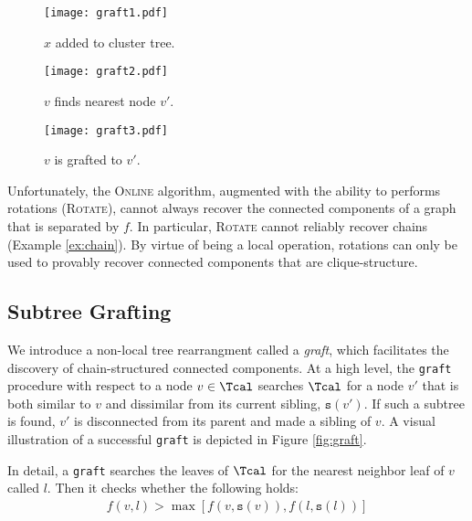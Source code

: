 \documentclass{article} \usepackage[utf8]{inputenc} \usepackage[T1]{fontenc}    \usepackage{hyperref}       \usepackage{url}            \usepackage{booktabs}       \usepackage{amsfonts}       \usepackage{nicefrac}       \usepackage{microtype}      \usepackage{geometry}
\newcommand{\algrotate}{\textsc{Rotate}\xspace}
\newcommand{\greedy}{\textsc{Online}\xspace}
\newcommand{\graft}{\texttt{graft}\xspace}
\newcommand{\sib}[1]{\ensuremath{\texttt{s}}(#1)\xspace}
\newcommand{\condition}[2]{\ensuremath{f(#1, #2) > \max[f(#1, \sib{#1}), f(#2, \sib{#2})]}}
\begin{document}
\begin{figure*}[t]
\captionsetup[subfigure]{justification=centering}
\begin{subfigure}[h]{0.32\textwidth}
  \centerline{\texttt{[image: graft1.pdf]}}
  \caption{$x$ added to cluster tree.}
\end{subfigure}
\begin{subfigure}[h]{0.32\textwidth}
  \centerline{\texttt{[image: graft2.pdf]}}
  \caption{$v$ finds nearest node $v'$.}
\end{subfigure}
\begin{subfigure}[h]{0.32\textwidth}
  \centerline{\texttt{[image: graft3.pdf]}}
  \caption{$v$ is grafted to $v'$.}
\end{subfigure}
\caption{The \texttt{graft} subroutine. Dotted lines denote new
  nodes and mergers. Before $x$ is added to tree, $l$ and $v'$ reside
  in disjoint subtrees even though they belong to the same
  ground-truth cluster. The addition of $x$ creates the subtree with root
  $v$ and initiates the \texttt{graft} subroutine.}
\label{fig:graft}
\end{figure*}
 
Unfortunately, the \greedy algorithm, augmented with the ability to
performs rotations (\algrotate), cannot always recover the connected
components of a graph that is separated by $f$. In particular,
\algrotate cannot reliably recover chains (Example \ref{ex:chain}).
By virtue of being a local operation, rotations can only be used to
provably recover connected components that are clique-structure.

\subsection{Subtree Grafting}
\label{subsec:graft}
We introduce a non-local tree rearrangment called a \emph{graft},
which facilitates the discovery of chain-structured connected
components. At a high level, the \graft procedure with respect to a
node $v \in \Tcal$ searches $\Tcal$ for a node $v'$ that is both
similar to $v$ and dissimilar from its current sibling, $\sib{v'}$. If
such a subtree is found, $v'$ is disconnected from its parent and made
a sibling of $v$. A visual illustration of a successful \graft is
depicted in Figure \ref{fig:graft}.

In detail, a \graft searches the leaves of $\Tcal$ for the nearest
neighbor leaf of $v$ called $l$. Then it checks whether the following holds:
\begin{align}
  \label{eq:graft}
  \condition{v}{l}
\end{align}
\end{document}
